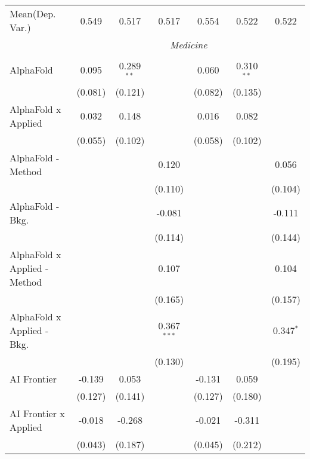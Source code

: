 \begin{tabular}{lcccccc}
Mean(Dep. Var.) & 0.549 & 0.517 & 0.517 & 0.554 & 0.522 & 0.522 \\
 & \multicolumn{6}{c}{\textit{Medicine}} \\ \\
   AlphaFold                      & 0.095   & 0.289$^{**}$ &                & 0.060   & 0.310$^{**}$   &   \\   
                                  & (0.081) & (0.121)      &                & (0.082) & (0.135)        &   \\   
   AlphaFold x Applied            & 0.032   & 0.148        &                & 0.016   & 0.082          &   \\   
                                  & (0.055) & (0.102)      &                & (0.058) & (0.102)        &   \\   
   AlphaFold - Method             &         &              & 0.120          &         &                & 0.056\\   
                                  &         &              & (0.110)        &         &                & (0.104)\\   
   AlphaFold - Bkg.               &         &              & -0.081         &         &                & -0.111\\   
                                  &         &              & (0.114)        &         &                & (0.144)\\   
   AlphaFold x Applied - Method   &         &              & 0.107          &         &                & 0.104\\   
                                  &         &              & (0.165)        &         &                & (0.157)\\   
   AlphaFold x Applied - Bkg.     &         &              & 0.367$^{***}$  &         &                & 0.347$^{*}$\\   
                                  &         &              & (0.130)        &         &                & (0.195)\\   
   AI Frontier                    & -0.139  & 0.053        &                & -0.131  & 0.059          &   \\   
                                  & (0.127) & (0.141)      &                & (0.127) & (0.180)        &   \\   
   AI Frontier x Applied          & -0.018  & -0.268       &                & -0.021  & -0.311         &   \\   
                                  & (0.043) & (0.187)      &                & (0.045) & (0.212)        &   \\   

\end{tabular}

